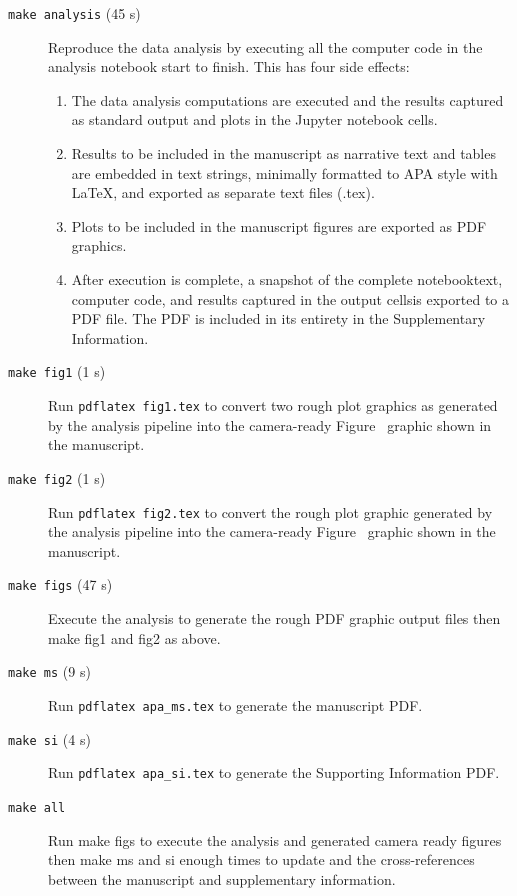 \documentclass[helv,10pt,man,floatsintext]{apa6}  %
\begin{document}
\begin{description}

\item [\texttt{make analysis} (45 s)] Reproduce the data analysis by
  executing all the computer code in the analysis notebook start to
  finish. This has four side effects:

\begin{enumerate}
  \item The data analysis computations are executed and the results captured
    as standard output and plots in the Jupyter notebook cells. 
  \item Results to be included in the manuscript as narrative text and
    tables are embedded in text strings, minimally formatted to APA
    style with \LaTeX{}, and exported as separate text files (.tex).
  \item Plots to be included in the manuscript figures are exported as
    PDF graphics.
  \item After execution is complete, a snapshot of the complete
    notebook\textemdash text, computer code, and results captured in
    the output cells\textemdash is exported to a PDF file. The PDF is
    included in its entirety in the Supplementary Information.
\end{enumerate}  

\item [\texttt{make fig1} (1 s)] Run
  \texttt{pdflatex fig1.tex} to convert two rough plot
  graphics as generated by the analysis pipeline into the camera-ready
  Figure~ graphic shown in the manuscript.

\item [\texttt{make fig2} (1 s)] Run \texttt{pdflatex fig2.tex}
  to convert the rough plot graphic generated by the analysis
  pipeline into the camera-ready Figure~ graphic shown in the
  manuscript.

\item [\texttt{make figs} (47 s)] Execute the analysis to generate the rough PDF graphic
  output files then make fig1 and fig2 as above. 

\item [\texttt{make ms} (9 s)] Run \texttt{pdflatex apa_ms.tex}
  to generate the manuscript PDF.

\item [\texttt{make si} (4 s)] Run \texttt{pdflatex apa_si.tex}
   to generate the Supporting Information PDF.

\item [\texttt{make all}] Run make figs to execute the
  analysis and generated camera ready figures then make ms and si
  enough times to update and the cross-references between the
  manuscript and supplementary information.

\end{description}
\end{document}
